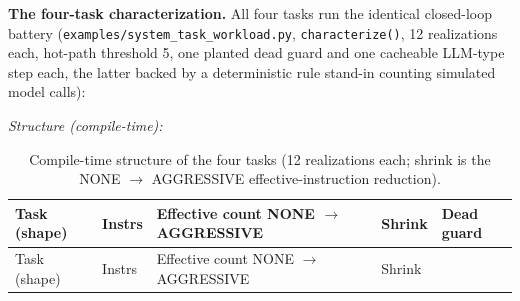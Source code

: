 \documentclass[
  11pt,
]{article}
\begin{document}
\textbf{The four-task characterization.} All four tasks run the
identical closed-loop battery
(\texttt{examples/system\_task\_workload.py}, \texttt{characterize()},
12 realizations each, hot-path threshold 5, one planted dead guard and
one cacheable LLM-type step each, the latter backed by a deterministic
rule stand-in counting simulated model calls):

\emph{Structure (compile-time):}

\begin{longtable}[]{@{}
  >{\raggedright\arraybackslash}p{}
  >{\raggedright\arraybackslash}p{}
  >{\raggedright\arraybackslash}p{}
  >{\raggedright\arraybackslash}p{}
  >{\raggedright\arraybackslash}p{}@{}}
\caption{Compile-time structure of the four tasks (12 realizations each;
shrink is the NONE \(\rightarrow\) AGGRESSIVE effective-instruction
reduction).}\tabularnewline
\toprule\noalign{}
\begin{minipage}[b]{\linewidth}\raggedright
Task (shape)
\end{minipage} & \begin{minipage}[b]{\linewidth}\raggedright
Instrs
\end{minipage} & \begin{minipage}[b]{\linewidth}\raggedright
Effective count NONE \(\rightarrow\) AGGRESSIVE
\end{minipage} & \begin{minipage}[b]{\linewidth}\raggedright
Shrink
\end{minipage} & \begin{minipage}[b]{\linewidth}\raggedright
Dead guard
\end{minipage} \\
\midrule\noalign{}
\endfirsthead
\toprule\noalign{}
\begin{minipage}[b]{\linewidth}\raggedright
Task (shape)
\end{minipage} & \begin{minipage}[b]{\linewidth}\raggedright
Instrs
\end{minipage} & \begin{minipage}[b]{\linewidth}\raggedright
Effective count NONE \(\rightarrow\) AGGRESSIVE
\end{minipage} & \begin{minipage}[b]{\linewidth}\raggedright
Shrink
\end{minipage} & \begin{minipage}[b]{\linewidth}\raggedright

\end{minipage}
\end{longtable}
\end{document}
